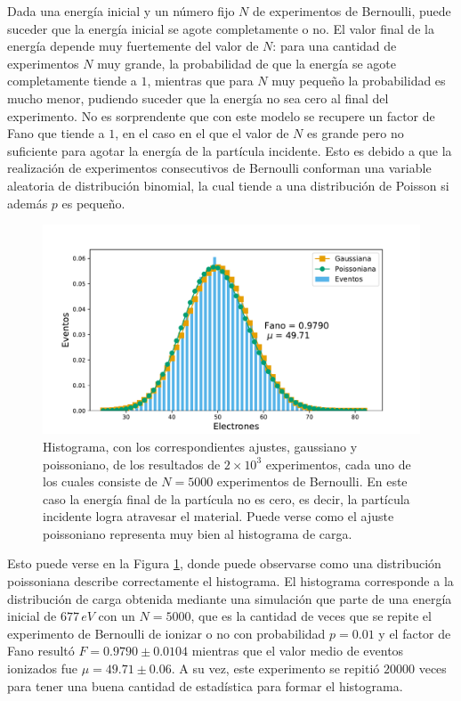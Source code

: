 Dada una energía inicial y un número fijo $N$ de experimentos de Bernoulli, puede suceder que la energía inicial se agote completamente o no. El valor final de la energía depende muy fuertemente del valor de $N$: para una cantidad de experimentos $N$ muy grande, la probabilidad de que la energía se agote completamente tiende a $1$, mientras que para $N$ muy pequeño la probabilidad es mucho menor, pudiendo suceder que la energía no sea cero al final del experimento. No es sorprendente que con este modelo se recupere un factor de Fano que tiende a $1$, en el caso en el que el valor de $N$ es grande pero no suficiente para agotar la energía de la partícula incidente. Esto es debido a que la realización de experimentos consecutivos de Bernoulli conforman una variable aleatoria de distribución binomial, la cual tiende a una distribución de Poisson si además $p$ es pequeño. 
\begin{figure}[h]
    \centering
    \includegraphics[scale=0.5]{Figs/Orden0_fano1.pdf}
    \caption{Histograma, con los correspondientes ajustes, gaussiano y poissoniano, de los resultados de $2\times 10^3$ experimentos, cada uno de los cuales consiste de $N = 5000$ experimentos de Bernoulli. En este caso la energía final de la partícula no es cero, es decir, la partícula incidente logra atravesar el material. Puede verse como el ajuste poissoniano representa muy bien al histograma de carga.}
    \label{fig:SimulacionOrden0Fano1}
\end{figure}
Esto puede verse en la Figura \ref{fig:SimulacionOrden0Fano1}, donde puede observarse como una distribución poissoniana describe correctamente el histograma. El histograma corresponde a la distribución de carga obtenida mediante una simulación que parte de una energía inicial de $677\,\si{eV}$ con un $N = 5000$, que es la cantidad de veces que se repite el experimento de Bernoulli de ionizar o no con probabilidad $p=0.01$ y el factor de Fano resultó $F = 0.9790 \pm 0.0104$ mientras que el valor medio de eventos ionizados fue $\mu = 49.71 \pm 0.06$. A su vez, este experimento se repitió $20000$ veces para tener una buena cantidad de estadística para formar el histograma.

